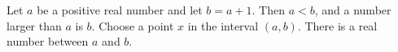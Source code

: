 Let $a$ be a positive real number and let $b = a + 1$.
Then $a < b$, and a number larger than $a$ is $b$.
Choose a point $x$ in the interval $(a, b)$.
There is a real number between $a$ and $b$.